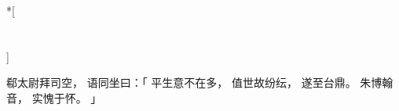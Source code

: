 
\switchcolumn[0]*[\section{}]

郗太尉拜司空，
语同坐曰：「
    平生意不在多，
    值世故纷纭，
    遂至台鼎。
    朱博翰音，
    实愧于怀。
」

\switchcolumn



